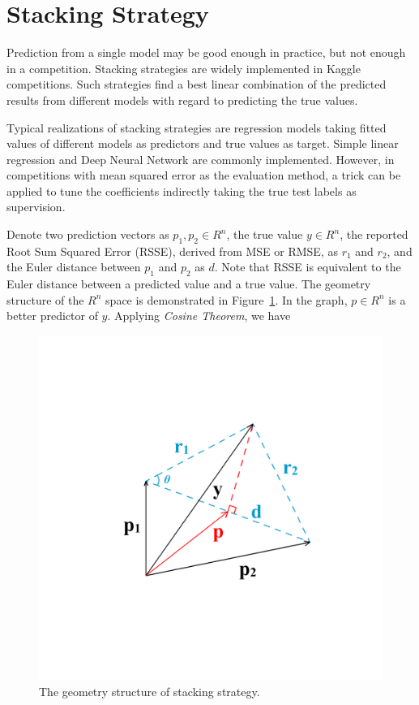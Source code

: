 \documentclass{article}
\begin{document}
\section{Stacking Strategy}

Prediction from a single model may be good enough in practice, but not enough in a competition. Stacking strategies are widely implemented in Kaggle competitions. Such strategies find a best linear combination of the predicted results from different models with regard to predicting the true values.

Typical realizations of stacking strategies are regression models taking fitted values of different models as predictors and true values as target. Simple linear regression and Deep Neural Network are commonly implemented. However, in competitions with mean squared error as the evaluation method, a trick can be applied to tune the coefficients indirectly taking the true test labels as supervision.

Denote two prediction vectors as $p_1, p_2 \in R^n$, the true value $y \in R^n$, the reported Root Sum Squared Error (RSSE), derived from MSE or RMSE, as $r_1$ and $r_2$, and the Euler distance between $p_1$ and $p_2$ as $d$. Note that RSSE is equivalent to the Euler distance between a predicted value and a true value. The geometry structure of the $R^n$ space is demonstrated in Figure~\ref{fig4}. In the graph, $p \in R^n$ is a better predictor of $y$. Applying \textit{Cosine Theorem}, we have

\begin{figure}[ht]
\vskip 0.2in
\begin{center}
\centerline{\includegraphics[width=\columnwidth]{cosine}}
\caption{The geometry structure of stacking strategy.}
\label{fig4}
\end{center}
\vskip -0.2in
\end{figure}
\end{document}
